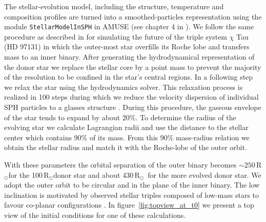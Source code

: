 \documentclass{aastex62}
\newcommand{\RSun}{\mbox{R$_\odot$}}
\begin{document}
The stellar-evolution model, including the structure, temperature and
composition profiles are turned into a smoothed-particles
representation using the module {\tt StellarModelInSPH} in AMUSE (see
chapter 4 in \cite{AMUSE}).  We follow the same procedure as described
in \cite{2014MNRAS.438.1909D} for simulating the future of the triple
system $\chi$ Tau (HD 97131) in which the outer-most star overfills
its Roche lobe and transfers mass to an inner binary.  After
generating the hydrodynamical representation of the donor star we
replace the stellar core by a point mass to prevent the majority of
the resolution to be confined in the star's central regions.  In a
following step we relax the star using the hydrodynamics solver. This
relaxation process is realized in 100 steps during which we reduce the
velocity dispersion of individual SPH particles to a glasses
structure \citep[see, for example, \S\,3.3 on page 40
  in][]{1994astro.ph.10043W}. During this procedure, the gaseous
envelope of the star tends to expand by about 20\%.  To determine the
radius of the evolving star we calculate Lagrangian radii and use the
distance to the stellar center which contains 90\% of its mass. From
this 90\% mass-radius relation we obtain the stellar radius and match
it with the Roche-lobe of the outer orbit.

With these parameters the orbital separation of the outer binary
becomes $\sim 250$\,\RSun for the 100\,\RSun donor star and about
430\,\RSun\, for the more evolved donor star.  We adopt the outer
orbit to be circular and in the plane of the inner binary.
The low inclination is motivated by observed stellar triples composed
of low-mass stars to favour co-planar configurations
\citep{2018ApJ...854...44M}.
In figure~\ref{fig:topview_at_t0} we present a top view of the initial
conditions for one of these calculations.
\end{document}
